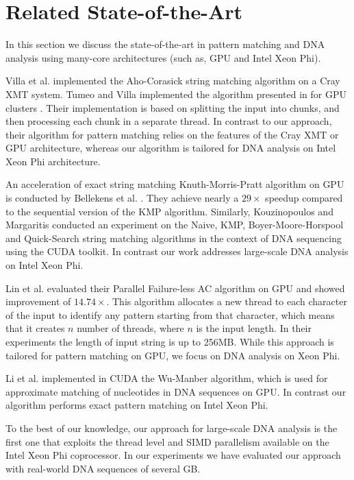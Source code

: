 \documentclass[conference]{IEEEtran}
\begin{document}
\section{Related State-of-the-Art} 
\label{related_work}

In this section we discuss the state-of-the-art in pattern matching and DNA analysis using many-core architectures (such as, GPU and Intel Xeon Phi).

Villa et al. \cite{VillaCM09} implemented the Aho-Corasick string matching algorithm on a Cray XMT system. Tumeo and Villa implemented the algorithm presented in \cite{VillaCM09} for GPU clusters \cite{Tumeo_DNA_GPU}. Their implementation is based on splitting the input into chunks, and then processing each chunk in a separate thread. In contrast to our approach, their algorithm for pattern matching relies on the features of the Cray XMT or GPU architecture, whereas our algorithm is tailored for DNA analysis on Intel Xeon Phi architecture.

An acceleration of exact string matching Knuth-Morris-Pratt algorithm on GPU is conducted by Bellekens et al. \cite{bellekens2013investigation}. They achieve nearly a $29\times$ speedup compared to the sequential version of the KMP algorithm. Similarly, Kouzinopoulos and Margaritis \cite{kouzinopoulos2009string} conducted an experiment on the Naive, KMP, Boyer-Moore-Horspool and Quick-Search string matching algorithms in the context of DNA sequencing using the CUDA toolkit. In contrast our work addresses large-scale DNA analysis on Intel Xeon Phi.  

Lin et al. \cite{Lin_PFA-C_Algo} evaluated their Parallel Failure-less AC algorithm on GPU and showed improvement of $14.74 \times$. This algorithm allocates a new thread to each character of the input to identify any pattern starting from that character, which means that it creates $n$ number of threads, where $n$ is the input length. In their experiments the length of input string is up to 256MB. While this approach is tailored for pattern matching on GPU, we focus on DNA analysis on Xeon Phi.

Li et al. \cite{wu-manber-cuda} implemented in CUDA the Wu-Manber algorithm, which is used for approximate matching of nucleotides in DNA sequences on GPU. In contrast our algorithm performs exact pattern matching on Intel Xeon Phi.

To the best of our knowledge, our approach for large-scale DNA analysis is the first one that exploits the thread level and SIMD parallelism available on the Intel Xeon Phi coprocessor. In our experiments we have evaluated our approach with real-world DNA sequences of several GB. 
\end{document}
